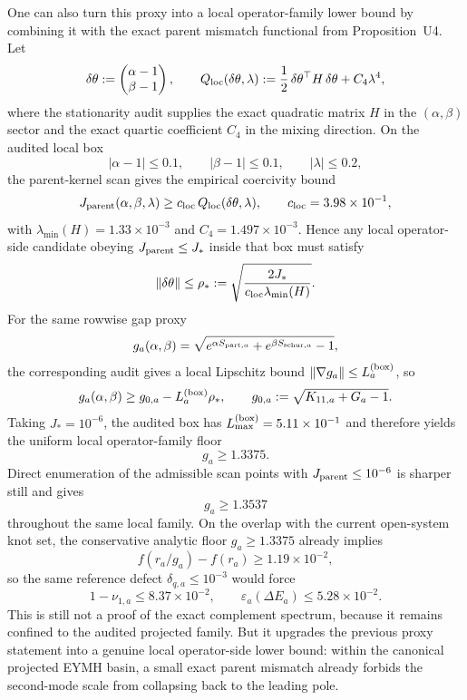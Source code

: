 \documentclass[aps,prd,onecolumn,notitlepage,nofootinbib,superscriptaddress,11pt,floatfix]{revtex4-2}
\begin{document}
One can also turn this proxy into a local operator-family lower bound by combining it with the exact parent mismatch functional from Proposition~U4. Let
\[
\delta\theta:=
\begin{pmatrix}
\alpha-1\\
\beta-1
\end{pmatrix},
\qquad
Q_{\rm loc}(\delta\theta,\lambda)
:=
\frac12\,\delta\theta^\top H\,\delta\theta + C_4\lambda^4,
\]
where the stationarity audit supplies the exact quadratic matrix $H$ in the $(\alpha,\beta)$ sector and the exact quartic coefficient $C_4$ in the mixing direction. On the audited local box
\[
|\alpha-1|\le 0.1,\qquad
|\beta-1|\le 0.1,\qquad
|\lambda|\le 0.2,
\]
the parent-kernel scan gives the empirical coercivity bound
\[
J_{\rm parent}(\alpha,\beta,\lambda)\ge c_{\rm loc}\,Q_{\rm loc}(\delta\theta,\lambda),
\qquad
c_{\rm loc}=3.98\times10^{-1},
\]
with $\lambda_{\min}(H)=1.33\times10^{-3}$ and $C_4=1.497\times10^{-3}$. Hence any local operator-side candidate obeying $J_{\rm parent}\le J_\ast$ inside that box must satisfy
\[
\|\delta\theta\|
\le
\rho_\ast:=
\sqrt{\frac{2J_\ast}{c_{\rm loc}\lambda_{\min}(H)}}.
\]
For the same rowwise gap proxy
\[
g_a(\alpha,\beta)=\sqrt{e^{\alpha S_{{\rm part},a}}+e^{\beta S_{{\rm schur},a}}-1},
\]
the corresponding audit gives a local Lipschitz bound $\|\nabla g_a\|\le L^{\rm(box)}_a$, so
\[
g_a(\alpha,\beta)\ge g_{0,a}-L^{\rm(box)}_a\rho_\ast,
\qquad
g_{0,a}:=\sqrt{K_{11,a}+G_a-1}.
\]
Taking $J_\ast=10^{-6}$, the audited box has $L^{\rm(box)}_{\max}=5.11\times10^{-1}$ and therefore yields the uniform local operator-family floor
\[
g_a\ge 1.3375.
\]
Direct enumeration of the admissible scan points with $J_{\rm parent}\le 10^{-6}$ is sharper still and gives
\[
g_a\ge 1.3537
\]
throughout the same local family. On the overlap with the current open-system knot set, the conservative analytic floor $g_a\ge 1.3375$ already implies
\[
f(r_a/g_a)-f(r_a)\ge 1.19\times10^{-2},
\]
so the same reference defect $\delta_{q,a}\le 10^{-3}$ would force
\[
1-\nu_{1,a}\le 8.37\times10^{-2},
\qquad
\varepsilon_a(\Delta E_a)\le 5.28\times10^{-2}.
\]
This is still not a proof of the exact complement spectrum, because it remains confined to the audited projected family. But it upgrades the previous proxy statement into a genuine local operator-side lower bound: within the canonical projected EYMH basin, a small exact parent mismatch already forbids the second-mode scale from collapsing back to the leading pole.
\end{document}
